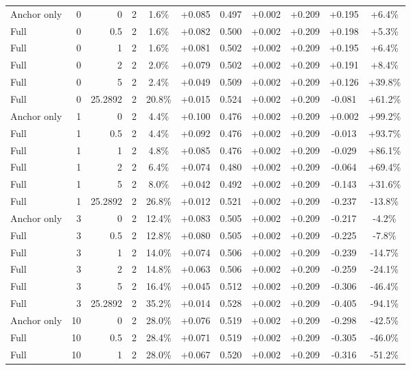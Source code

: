 \begin{table}[htbp]
\begin{tabular}{lrrrccccccc}
Anchor only & 0 & 0 & 2 & 1.6\% & +0.085 & 0.497 & +0.002 & +0.209 & +0.195 & +6.4\% \\
Full & 0 & 0.5 & 2 & 1.6\% & +0.082 & 0.500 & +0.002 & +0.209 & +0.198 & +5.3\% \\
Full & 0 & 1 & 2 & 1.6\% & +0.081 & 0.502 & +0.002 & +0.209 & +0.195 & +6.4\% \\
Full & 0 & 2 & 2 & 2.0\% & +0.079 & 0.502 & +0.002 & +0.209 & +0.191 & +8.4\% \\
Full & 0 & 5 & 2 & 2.4\% & +0.049 & 0.509 & +0.002 & +0.209 & +0.126 & +39.8\% \\
Full & 0 & 25.2892 & 2 & 20.8\% & +0.015 & 0.524 & +0.002 & +0.209 & -0.081 & +61.2\% \\
Anchor only & 1 & 0 & 2 & 4.4\% & +0.100 & 0.476 & +0.002 & +0.209 & +0.002 & +99.2\% \\
Full & 1 & 0.5 & 2 & 4.4\% & +0.092 & 0.476 & +0.002 & +0.209 & -0.013 & +93.7\% \\
Full & 1 & 1 & 2 & 4.8\% & +0.085 & 0.476 & +0.002 & +0.209 & -0.029 & +86.1\% \\
Full & 1 & 2 & 2 & 6.4\% & +0.074 & 0.480 & +0.002 & +0.209 & -0.064 & +69.4\% \\
Full & 1 & 5 & 2 & 8.0\% & +0.042 & 0.492 & +0.002 & +0.209 & -0.143 & +31.6\% \\
Full & 1 & 25.2892 & 2 & 26.8\% & +0.012 & 0.521 & +0.002 & +0.209 & -0.237 & -13.8\% \\
Anchor only & 3 & 0 & 2 & 12.4\% & +0.083 & 0.505 & +0.002 & +0.209 & -0.217 & -4.2\% \\
Full & 3 & 0.5 & 2 & 12.8\% & +0.080 & 0.505 & +0.002 & +0.209 & -0.225 & -7.8\% \\
Full & 3 & 1 & 2 & 14.0\% & +0.074 & 0.506 & +0.002 & +0.209 & -0.239 & -14.7\% \\
Full & 3 & 2 & 2 & 14.8\% & +0.063 & 0.506 & +0.002 & +0.209 & -0.259 & -24.1\% \\
Full & 3 & 5 & 2 & 16.4\% & +0.045 & 0.512 & +0.002 & +0.209 & -0.306 & -46.4\% \\
Full & 3 & 25.2892 & 2 & 35.2\% & +0.014 & 0.528 & +0.002 & +0.209 & -0.405 & -94.1\% \\
Anchor only & 10 & 0 & 2 & 28.0\% & +0.076 & 0.519 & +0.002 & +0.209 & -0.298 & -42.5\% \\
Full & 10 & 0.5 & 2 & 28.4\% & +0.071 & 0.519 & +0.002 & +0.209 & -0.305 & -46.0\% \\
Full & 10 & 1 & 2 & 28.0\% & +0.067 & 0.520 & +0.002 & +0.209 & -0.316 & -51.2\% \\

\end{tabular}
\end{table}
